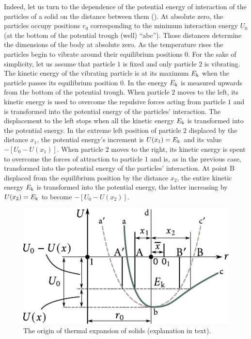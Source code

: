 Indeed, let us turn to the dependence of the potential energy of interaction of the particles of a solid on the distance between them (). At absolute zero, the particles occupy positions $r_0$ corresponding to the minimum interaction energy $U_0$ (at the bottom of the potential trough (well) ``abc''). Those distances determine the dimensions of the body at absolute zero. As the temperature rises the particles begin to vibrate around their equilibrium positions $0$. For the sake of simplicity, let us assume that particle $1$ is fixed and only particle $2$ is vibrating. The kinetic energy of the vibrating particle is at its maximum $E_{\text{k}}$ when the particle passes its equilibrium position $0$. In  the energy $E_{\text{k}}$ is measured upwards from the bottom of the potential trough. When particle $2$ moves to the left, its kinetic energy is used to overcome the repulsive forces acting from particle $1$ and is transformed into the potential energy of the particles' interaction. The displacement to the left stops when all the kinetic energy
$E_{\text{k}}$ is transformed into the potential energy. In the extreme left position of particle $2$ displaced by the distance $x_1$, the potential energy's increment is $U(x_1)=E_{\text{k}}$ and its value $-[U_0-U(x_1)]$. When particle $2$ moves to the right, its kinetic energy is spent to overcome the forces of attraction to particle $1$ and is, as in the previous case, transformed into the potential energy of the particles' interaction. At point B displaced from the equilibrium position by the distance $x_2$, the entire kinetic energy $E_{\text{k}}$ is transformed into the potential energy, the latter increasing by $U(x_2)=E_{\text{k}}$ to become $-[U_0-U(x_2)]$.

\begin{figure}[t]
	\begin{center}
		\includegraphics[scale=1]{figures/ch_04/fig_4_7.pdf}
		\caption[]{The origin of thermal expansion of solids (explanation in text).}
		\label{fig:4_7}
	\end{center}
	\vspace{-0.7cm}
\end{figure}

